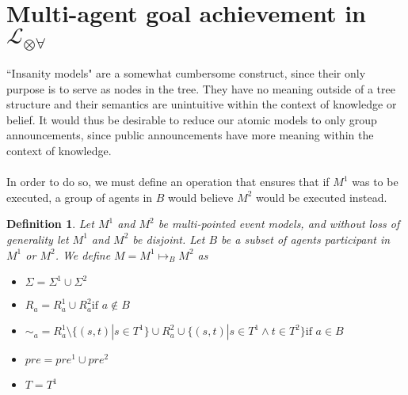 \documentclass[12pt, a4paper, titlepage]{scrartcl}
\newtheorem{defn}{Definition}[section]
\numberwithin{equation}{section}
\newcommand{\lang}{\mathcal{L}}
\newcommand{\langArbAct}{\lang_{\otimes\forall}}
\begin{document}
\section{Multi-agent goal achievement in $\langArbAct$}

``Insanity models" are a somewhat cumbersome construct, since their only purpose
is to serve as nodes in the tree.
They have no meaning outside of a tree structure and their semantics are
unintuitive within the context of knowledge or belief.
It would thus be desirable to reduce our atomic models to only group
announcements, since public announcements have more meaning within the context of
knowledge.\\
\\
In order to do so, we must define an operation that ensures that if $M^1$ was to
be executed, a group of agents in $B$ would believe $M^2$ would be executed
instead.
\begin{defn} \label{possTwo}
Let $M^1$ and $M^2$ be multi-pointed event models, and without loss of
generality let $M^1$ and $M^2$ be disjoint.
Let $B$ be a subset of agents participant in $M^1$ or $M^2$.
We define $M = M^1 \mapsto_B M^2$ as 
\begin{itemize}
  \item $\Sigma = \Sigma^1 \cup \Sigma^2$
  \item $R_a =
    R^1_a \cup R^2_a \text{if } a \notin B$
	\item $\sim_a =
      R^1_a \setminus \{(s,t) | s \in T^1 \} \cup
      R^2_a \cup
      \{(s,t) | s \in T^1 \land t \in T^2 \}
    \text{if } a \in B$
  \item $pre = pre^1 \cup pre^2$
  \item $T = T^1$
\end{itemize}
\end{defn}
\end{document}
